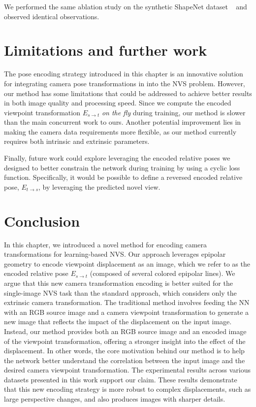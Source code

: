 We performed the same ablation study on the synthetic ShapeNet dataset ~\cite{chang2015shapenet} and observed identical observations.

\section{Limitations and further work}
The pose encoding strategy introduced in this chapter is an innovative solution for integrating camera pose transformations in into the \ac{NVS} problem. However, our method has some limitations that could be addressed to achieve better results in both image quality and processing speed. Since we compute the encoded viewpoint transformation $E_{s\xrightarrow{}t}$ \textit{on the fly} during training, our method is slower than the main concurrent work \citep{kim2020novel} to ours. Another potential improvement lies in making the camera data requirements more flexible, as our method currently requires both intrinsic and extrinsic parameters. 

Finally, future work could explore leveraging the encoded relative poses we designed to better constrain the network during training by using a cyclic loss function. Specifically, it would be possible to define a reversed encoded relative pose, $E_{t\xrightarrow{}s}$, by leveraging the predicted novel view. 

\section{Conclusion}
In this chapter, we introduced a novel method for encoding camera transformations for learning-based \ac{NVS}. Our approach leverages epipolar geometry to encode viewpoint displacement as an image, which we refer to as the encoded relative pose $E_{s\xrightarrow{}t}$ (composed of several colored epipolar lines). We argue that this new camera transformation encoding is better suited for the single-image \ac{NVS} task than the standard approach, which considers only the extrinsic camera transformation. The traditional method involves feeding the \ac{NN} with an RGB source image and a camera viewpoint transformation to generate a new image that reflects the impact of the displacement on the input image. Instead, our method provides both an RGB source image and an encoded image of the viewpoint transformation, offering a stronger insight into the effect of the displacement. In other words, the core motivation behind our method is to help the network better understand the correlation between the input image and the desired camera viewpoint transformation. The experimental results across various datasets presented in this work support our claim. These results demonstrate that this new encoding strategy is more robust to complex displacements, such as large perspective changes, and also produces images with sharper details.